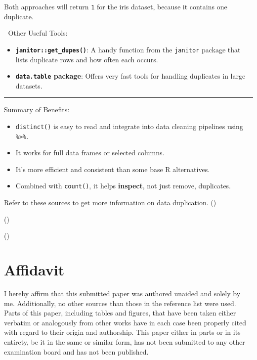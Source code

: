 \documentclass[
  man,
  floatsintext,
  longtable,
  nolmodern,
  notxfonts,
  notimes,
  colorlinks=true,linkcolor=blue,citecolor=blue,urlcolor=blue]{apa7}
\providecommand{\tightlist}{%
  \setlength{\itemsep}{0pt}\setlength{\parskip}{0pt}}
\begin{document}
Both approaches will return \texttt{1} for the iris dataset, because it
contains one duplicate.

🔹 Other Useful Tools:

\begin{itemize}
\tightlist
\item
  \textbf{\texttt{janitor::get\_dupes()}}: A handy function from the
  \texttt{janitor} package that lists duplicate rows and how often each
  occurs.
\item
  \textbf{\texttt{data.table} package}: Offers very fast tools for
  handling duplicates in large datasets.
\end{itemize}

\begin{center}\rule{0.5\linewidth}{0.5pt}\end{center}

Summary of Benefits:

\begin{itemize}
\tightlist
\item
  \texttt{distinct()} is easy to read and integrate into data cleaning
  pipelines using \texttt{\%\textgreater{}\%}.
\item
  It works for full data frames or selected columns.
\item
  It's more efficient and consistent than some base R alternatives.
\item
  Combined with \texttt{count()}, it helps \textbf{inspect}, not just
  remove, duplicates.
\end{itemize}

Refer to these sources to get more information on data duplication.
()

()

()

\section{Affidavit}\label{affidavit}

I hereby affirm that this submitted paper was authored unaided and
solely by me. Additionally, no other sources than those in the reference
list were used. Parts of this paper, including tables and figures, that
have been taken either verbatim or analogously from other works have in
each case been properly cited with regard to their origin and
authorship. This paper either in parts or in its entirety, be it in the
same or similar form, has not been submitted to any other examination
board and has not been published.
\end{document}
